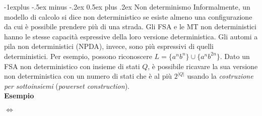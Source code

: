 \documentclass[10pt,landscape]{article}
\makeatletter
\renewcommand{\subsection}{\@startsection{subsection}{2}{0mm}%
                                {-1explus -.5ex minus -.2ex}%
                                {0.5ex plus .2ex}%
                                {\normalfont\large\bfseries}}
\makeatother
\begin{document}
\begin{multicols*}{4}
        \subsection{Non determinismo}
        Informalmente, un modello di calcolo si dice non deterministico se esiste almeno una configurazione da cui è possibile prendere più di una strada. Gli FSA e le MT non deterministici hanno le stesse capacità espressive della loro versione deterministica. Gli automi a pila non deterministici (NPDA), invece, sono più espressivi di quelli deterministici. Per esempio, possono riconoscere $L = \{a^nb^n\} \cup \{a^nb^{2n}\}$. Dato un FSA non deterministico con insieme di stati $Q$, è possibile ricavare la sua versione non deterministica con un numero di stati che è al più $2^{|Q|}$ usando la \textit{costruzione per sottoinsiemi} (\textit{powerset construction}).\\ [3pt]
        \textbf{Esempio} \\ [3pt]
        \hspace{9pt}$\iff$\hspace{8pt}

\end{multicols*}
\end{document}

